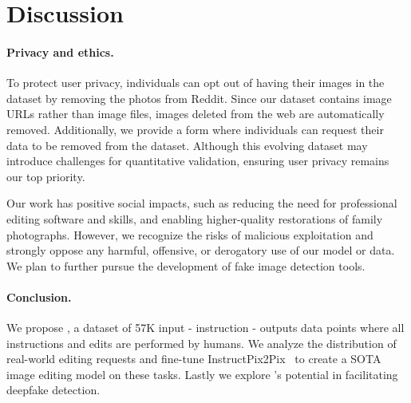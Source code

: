 \section{Discussion}

\paragraph{Privacy and ethics.}
To protect user privacy, individuals can opt out of having their images in the dataset by removing the photos from Reddit. Since our dataset contains image URLs rather than image files, images deleted from the web are automatically removed. Additionally, we provide a form where individuals can request their data to be removed from the dataset. Although this evolving dataset may introduce challenges for quantitative validation, ensuring user privacy remains our top priority. 

Our work has positive social impacts, such as reducing the need for professional editing software and skills, and enabling higher-quality restorations of family photographs. However, we recognize the risks of malicious exploitation and strongly oppose any harmful, offensive, or derogatory use of our model or data. We plan to further pursue the development of fake image detection tools.

\paragraph{Conclusion.}
We propose \RealEdit, a dataset of 57K input - instruction - outputs data points where all instructions and edits are performed by humans. We analyze the distribution of real-world editing requests and fine-tune InstructPix2Pix~\cite{brooks2023instructpix2pix} to create a SOTA image editing model on these tasks. Lastly we explore \ours’s potential in facilitating deepfake detection.


